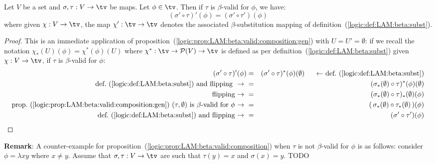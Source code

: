 \begin{prop}\label{logic:prop:LAM:beta:valid:composition}
    Let $V$ be a set and $\sigma,\tau:V\to\tv$ be maps. Let $\phi\in\tv$. Then
    if $\tau$ is $\beta$-valid for $\phi$, we have:
        \[
            (\sigma'\circ\tau)' (\phi) = (\sigma'\circ\tau')(\phi)
        \]
    where given $\chi:V\to\tv$, the map $\chi':\tv\to\tv$ denotes the 
    associated $\beta$-substitution mapping of 
    definition~(\ref{logic:def:LAM:beta:subst}).
\end{prop}
\begin{proof}
    This is an immediate application of 
    proposition~(\ref{logic:prop:LAM:beta:valid:composition:gen}) with
    $U=U'=\emptyset$: if we recall
    the notation $\chi_{*}(U)(\phi)=\chi^{*}(\phi)(U)$ where $\chi^{*}:\tv\to
    {\cal P}(V)\to\tv$ is defined as per 
    definition~(\ref{logic:def:LAM:beta:subst}) given $\chi:V\to\tv$, 
    if $\tau$ is $\beta$-valid for $\phi$:
        \begin{eqnarray*}(\sigma'\circ\tau)'(\phi)
            &=&(\sigma'\circ\tau)^{*}(\phi)(\emptyset)
            \mbox{\ \ \ \ \ $\leftarrow$\ def.~(\ref{logic:def:LAM:beta:subst})}\\
            \mbox{def.~(\ref{logic:def:LAM:beta:subst}) and flipping
            \ $\to$\ }
            &=&(\sigma_{*}(\emptyset)\circ\tau)^{*}(\phi)(\emptyset)\\
            \mbox{flipping\ $\to$\ }
            &=&(\sigma_{*}(\emptyset)\circ\tau)_{*}(\emptyset)(\phi)\\
            \mbox{prop.~(\ref{logic:prop:LAM:beta:valid:composition:gen})
            $(\tau,\emptyset)$ is $\beta$-valid for $\phi$\ $\to$\ }
            &=&(\,\sigma_{*}(\emptyset)\circ\tau_{*}(\emptyset)\,)(\phi)\\
            \mbox{def.~(\ref{logic:def:LAM:beta:subst}) and flipping\ $\to$\ }
            &=&(\sigma'\circ\tau')(\phi)
        \end{eqnarray*}
\end{proof}

\noindent
{\bf Remark}: A counter-example for
proposition~(\ref{logic:prop:LAM:beta:valid:composition}) when $\tau$ is not
$\beta$-valid for $\phi$ is as follows: consider $\phi=\lambda x y$ where
$x\neq y$. Assume that $\sigma,\tau:V\to\tv$ are such that
$\tau(y)=x$ and $\sigma(x)=y$.  TODO


